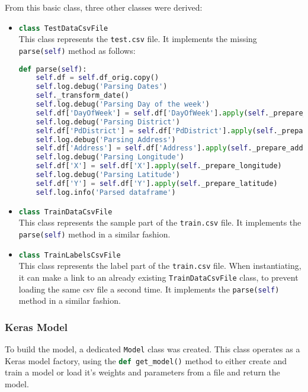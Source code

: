 \documentclass[titlepage,12pt]{article}
\newcommand{\inlinelisting}[1]{\colorbox{BackgroundColour!95!ForegroundColour}{\color{ForegroundColour!70!BackgroundColour}\lstinline[columns=fixed,language=python]{#1}}}
\begin{document}
From this basic class, three other classes were derived:
\begin{itemize}
\item \inlinelisting{class TestDataCsvFile}\\
This class represents the \texttt{test.csv} file. It implements the missing \inlinelisting{parse(self)} method as follows:\\
\begin{lstlisting}[language=python,label=lst:testdatacsvfile_parse,caption={Parse method if the TestDataCsvFile class}]
def parse(self):
    self.df = self.df_orig.copy()
    self.log.debug('Parsing Dates')
    self._transform_date()
    self.log.debug('Parsing Day of the week')
    self.df['DayOfWeek'] = self.df['DayOfWeek'].apply(self._prepare_day)
    self.log.debug('Parsing District')
    self.df['PdDistrict'] = self.df['PdDistrict'].apply(self._prepare_district)
    self.log.debug('Parsing Address')
    self.df['Address'] = self.df['Address'].apply(self._prepare_address)
    self.log.debug('Parsing Longitude')
    self.df['X'] = self.df['X'].apply(self._prepare_longitude)
    self.log.debug('Parsing Latitude')
    self.df['Y'] = self.df['Y'].apply(self._prepare_latitude)
    self.log.info('Parsed dataframe')
\end{lstlisting}
\item \inlinelisting{class TrainDataCsvFile}\\
This class represents the sample part of the \texttt{train.csv} file. It implements the \inlinelisting{parse(self)} method in a similar fashion.
\item \inlinelisting{class TrainLabelsCsvFile}\\
This class represents the label part of the \texttt{train.csv} file. When instantiating, it can make a link to an already existing \inlinelisting{TrainDataCsvFile} class, to prevent loading the same csv file a second time. It implements the \inlinelisting{parse(self)} method in a similar fashion.
\end{itemize}

\subsubsection{Keras Model}\label{sss:keras_model}
To build the model, a dedicated \inlinelisting{Model} class was created. This class operates as a Keras model factory, using the \inlinelisting{def get_model()} method to either create and train a model or load it's weights and parameters from a file and return the model.
\end{document}
